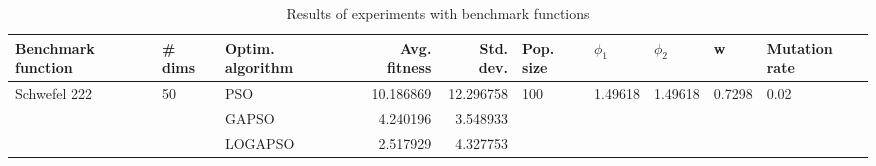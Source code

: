 \begin{table}
\centering
\caption{Results of experiments with benchmark functions}
\begin{tabular}{lllrrlllll}
\toprule
           Benchmark function &             \# dims & Optim. algorithm &  Avg. fitness &  Std. dev. &            Pop. size &               $\phi_{1}$ &               $\phi_{2}$ &                       w &         Mutation rate \\
\midrule
\multirow{3}{*}{Schwefel 222} & \multirow{3}{*}{50} &              PSO &     10.186869 &  12.296758 & \multirow{3}{*}{100} & \multirow{3}{*}{1.49618} & \multirow{3}{*}{1.49618} & \multirow{3}{*}{0.7298} & \multirow{3}{*}{0.02} \\
                              &                     &            GAPSO &      4.240196 &   3.548933 &                      &                          &                          &                         &                       \\
                              &                     &          LOGAPSO &      2.517929 &   4.327753 &                      &                          &                          &                         &                       \\
\bottomrule
\end{tabular}
\end{table}
